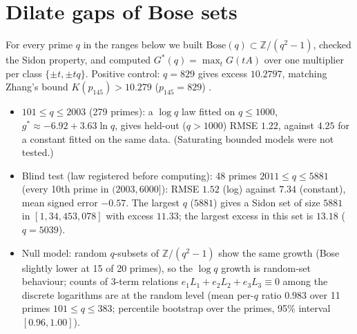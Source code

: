 \documentclass[11pt]{article}
\begin{document}
\section{Dilate gaps of Bose sets}
For every prime $q$ in the ranges below we built $\mathrm{Bose}(q)\subset\mathbb Z/(q^2-1)$, checked the Sidon property, and computed
$G^*(q)=\max_t G(tA)$ over one multiplier per class $\{\pm t,\pm tq\}$. Positive control: $q=829$ gives excess $10.2797$, matching
Zhang's bound $K(p_{145})>10.279$ ($p_{145}=829$) \cite{Z}.
\begin{itemize}
\item $101\le q\le2003$ (279 primes): a $\log q$ law fitted on $q\le1000$, $g^*\approx-6.92+3.63\ln q$, gives held-out ($q>1000$)
RMSE $1.22$, against $4.25$ for a constant fitted on the same data. (Saturating bounded models were not tested.)
\item Blind test (law registered before computing): 48 primes $2011\le q\le5881$ (every 10th prime in $(2003,6000]$): RMSE $1.52$
(log) against $7.34$ (constant), mean signed error $-0.57$. The largest $q$ ($5881$) gives a Sidon set of size $5881$ in $[1,34{,}453{,}078]$ with excess $11.33$; the largest excess in
this set is $13.18$ ($q=5039$).
\item Null model: random $q$-subsets of $\mathbb Z/(q^2-1)$ show the same growth (Bose slightly lower at 15 of 20 primes), so the
$\log q$ growth is random-set behaviour; counts of 3-term relations $e_1L_1+e_2L_2+e_3L_3\equiv0$ among the discrete logarithms are at
the random level (mean per-$q$ ratio $0.983$ over 11 primes $101\le q\le383$; percentile bootstrap over the primes, 95\% interval
$[0.96,1.00]$).
\end{itemize}
\end{document}
